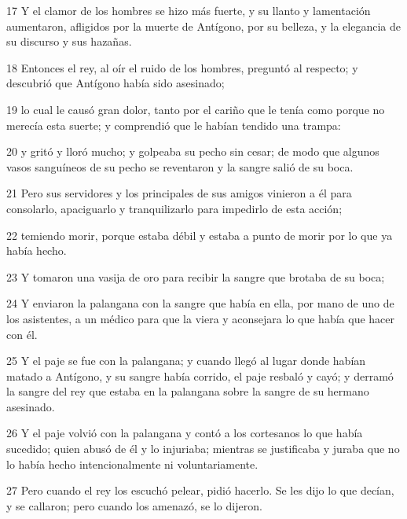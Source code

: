 \par 17 Y el clamor de los hombres se hizo más fuerte, y su llanto y lamentación aumentaron, afligidos por la muerte de Antígono, por su belleza, y la elegancia de su discurso y sus hazañas.

\par 18 Entonces el rey, al oír el ruido de los hombres, preguntó al respecto; y descubrió que Antígono había sido asesinado;

\par 19 lo cual le causó gran dolor, tanto por el cariño que le tenía como porque no merecía esta suerte; y comprendió que le habían tendido una trampa:

\par 20 y gritó y lloró mucho; y golpeaba su pecho sin cesar; de modo que algunos vasos sanguíneos de su pecho se reventaron y la sangre salió de su boca.

\par 21 Pero sus servidores y los principales de sus amigos vinieron a él para consolarlo, apaciguarlo y tranquilizarlo para impedirlo de esta acción;

\par 22 temiendo morir, porque estaba débil y estaba a punto de morir por lo que ya había hecho.

\par 23 Y tomaron una vasija de oro para recibir la sangre que brotaba de su boca;

\par 24 Y enviaron la palangana con la sangre que había en ella, por mano de uno de los asistentes, a un médico para que la viera y aconsejara lo que había que hacer con él.

\par 25 Y el paje se fue con la palangana; y cuando llegó al lugar donde habían matado a Antígono, y su sangre había corrido, el paje resbaló y cayó; y derramó la sangre del rey que estaba en la palangana sobre la sangre de su hermano asesinado.

\par 26 Y el paje volvió con la palangana y contó a los cortesanos lo que había sucedido; quien abusó de él y lo injuriaba; mientras se justificaba y juraba que no lo había hecho intencionalmente ni voluntariamente.

\par 27 Pero cuando el rey los escuchó pelear, pidió hacerlo. Se les dijo lo que decían, y se callaron; pero cuando los amenazó, se lo dijeron.

